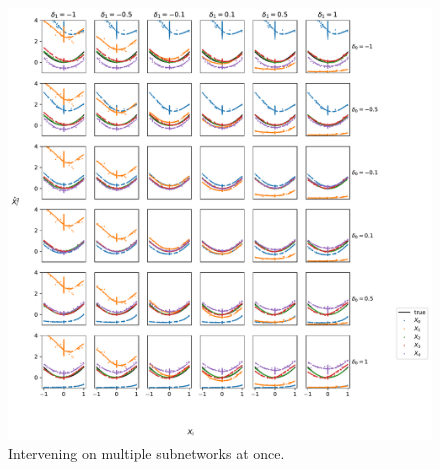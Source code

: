 \documentclass{article}
\theoremstyle{plain}
\theoremstyle{definition}
\theoremstyle{remark}
\begin{document}
\begin{figure}[ht]
    \centerline{\includegraphics[width=\textwidth]{../figures/s9_squared_intervention_multi_features.pdf}}
    \centering
    \caption{Intervening on multiple subnetworks at once.}\label{fig:s9_squared_intervention_multi_features}
\end{figure}


\end{document}
